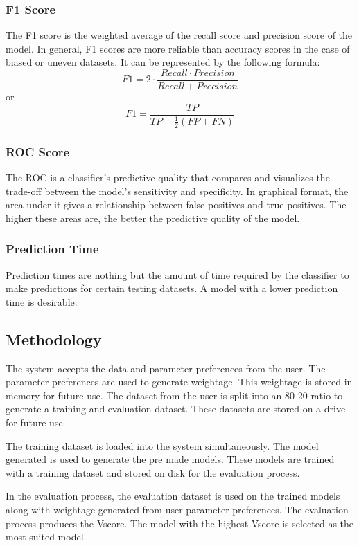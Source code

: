 {\subsubsection{F1 Score}\label{subsubsec:f1_score}
The F1 score is the weighted average of the recall score and precision score of the model. In general, F1 scores are more reliable than accuracy scores in the case of biased or uneven datasets. It can be represented by the following formula:
\begin{equation*}\label{eq:f1_score}
    F1 = 2 \cdot \frac{Recall \cdot Precision}{Recall + Precision}
\end{equation*}
or
\begin{equation*}\label{eq:f1_score_2}
    F1 = \frac{TP}{TP+\frac{1}{2}(FP+FN)}
\end{equation*}

\subsubsection{ROC Score}\label{subsubsec:roc_score}
The ROC is a classifier's predictive quality that compares and visualizes the trade-off between the model's sensitivity and specificity. In graphical format, the area under it gives a relationship between false positives and true positives. The higher these areas are, the better the predictive quality of the model.

\subsubsection{Prediction Time}\label{subsubsec:prediction_time}
Prediction times are nothing but the amount of time required by the classifier to make predictions for certain testing datasets. A model with a lower prediction time is desirable.

\subsection{Methodology} \label{subsec:methodology}
The system accepts the data and parameter preferences from the user. The parameter preferences are used to generate weightage. This weightage is stored in memory for future use. The dataset from the user is split into an 80-20 ratio to generate a training and evaluation dataset. These datasets are stored on a drive for future use.

The training dataset is loaded into the system simultaneously. The model generated is used to generate the pre made models. These models are trained with a training dataset and stored on disk for the evaluation process.

In the evaluation process, the evaluation dataset is used on the trained models along with weightage generated from user parameter preferences. The evaluation process produces the Vscore. The model with the highest Vscore is selected as the most suited model.
}

